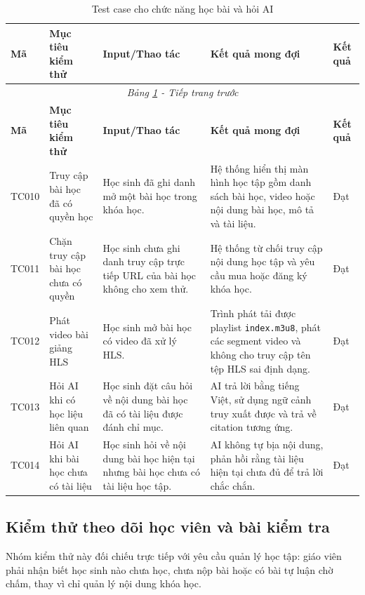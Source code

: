 \documentclass[../DoAn.tex]{subfiles}
\begin{document}
\small
\setlength{\tabcolsep}{3pt}
\renewcommand{\arraystretch}{1.25}
\begin{longtable}{|p{}|p{}|p{}|p{}|p{}|}
\caption{Test case cho chức năng học bài và hỏi AI}
\label{tab:test_learning_ai}\\
\hline
\textbf{Mã} & \textbf{Mục tiêu kiểm thử} & \textbf{Input/Thao tác} & \textbf{Kết quả mong đợi} & \textbf{Kết quả} \\ \hline
\endfirsthead
\multicolumn{5}{c}{\textit{Bảng \ref{tab:test_learning_ai} - Tiếp trang trước}}\\
\hline
\textbf{Mã} & \textbf{Mục tiêu kiểm thử} & \textbf{Input/Thao tác} & \textbf{Kết quả mong đợi} & \textbf{Kết quả} \\ \hline
\endhead
TC010 & Truy cập bài học đã có quyền học & Học sinh đã ghi danh mở một bài học trong khóa học. & Hệ thống hiển thị màn hình học tập gồm danh sách bài học, video hoặc nội dung bài học, mô tả và tài liệu. & Đạt \\ \hline
TC011 & Chặn truy cập bài học chưa có quyền & Học sinh chưa ghi danh truy cập trực tiếp URL của bài học không cho xem thử. & Hệ thống từ chối truy cập nội dung học tập và yêu cầu mua hoặc đăng ký khóa học. & Đạt \\ \hline
TC012 & Phát video bài giảng HLS & Học sinh mở bài học có video đã xử lý HLS. & Trình phát tải được playlist \texttt{index.m3u8}, phát các segment video và không cho truy cập tên tệp HLS sai định dạng. & Đạt \\ \hline
TC013 & Hỏi AI khi có học liệu liên quan & Học sinh đặt câu hỏi về nội dung bài học đã có tài liệu được đánh chỉ mục. & AI trả lời bằng tiếng Việt, sử dụng ngữ cảnh truy xuất được và trả về citation tương ứng. & Đạt \\ \hline
TC014 & Hỏi AI khi bài học chưa có tài liệu & Học sinh hỏi về nội dung bài học hiện tại nhưng bài học chưa có tài liệu học tập. & AI không tự bịa nội dung, phản hồi rằng tài liệu hiện tại chưa đủ để trả lời chắc chắn. & Đạt \\ \hline
\end{longtable}
\normalsize

\subsection{Kiểm thử theo dõi học viên và bài kiểm tra}

Nhóm kiểm thử này đối chiếu trực tiếp với yêu cầu quản lý học tập: giáo viên phải nhận biết học sinh nào chưa học, chưa nộp bài hoặc có bài tự luận chờ chấm, thay vì chỉ quản lý nội dung khóa học.
\end{document}
